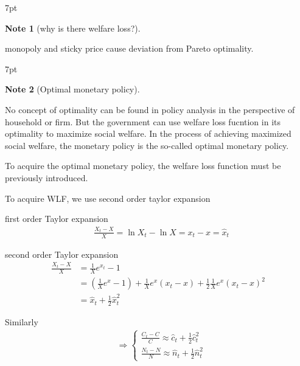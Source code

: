 \documentclass{article}
\newenvironment{blueblock}{
\def\FrameCommand{
  \hspace{1pt}
    {\color{DarkBlue}
    \vrule width 2pt}
    {\color{blueshade}
    \vrule width 4pt}
  \colorbox{blueshade}
}
\MakeFramed{
  \advance
  \hsize-
  \width
  \FrameRestore}
\noindent\hspace{-4.55pt}%
\begin{adjustwidth}{}{7pt}
\vspace{2pt}\vspace{2pt}
}
{\vspace{2pt}\end{adjustwidth}\endMakeFramed}
\newtheorem{note}{Note}
\begin{document}
\begin{blueblock}
\begin{note}[why is there welfare loss?]
\end{note}
monopoly and sticky price cause deviation from Pareto optimality.
\end{blueblock}



\begin{blueblock}
\begin{note}[Optimal monetary policy]
\end{note}
No concept of optimality can be found in policy analysis in the perspective of household or firm. But the government can use welfare loss fucntion in its optimality to maximize social welfare. In the process of achieving maximized social welfare, the monetary policy is the so-called optimal monetary policy.

\end{blueblock}

To acquire the optimal monetary policy, the welfare loss function must be previously introduced.


To acquire WLF, we use second order taylor expansion

first order Taylor expansion
\begin{align}
& \frac{X_t -X}{X}=\ln X_t -\ln X=x_t -x =\hat x_t 
\end{align}

second order Taylor expansion
\begin{equation}
\begin{split}
 \frac{X_t -X}{X}&=\frac{1}{X}e^{x_t}-1
\\& = (\frac{1}{X}e^x -1)+\frac{1}{X}e^x(x_t -x)+\frac{1}{2}\frac{1}{X}e^x (x_t-x)^2
\\& = \hat x_t +\frac{1}{2}\hat x_t^2
\end{split}
\end{equation}

Similarly
\begin{align}
& \Rightarrow 
\begin{cases}
\frac{C_t -C}{C}\approx \hat c_t +\frac{1}{2} \hat c_t^2 
\\\frac{N_t -N}{N}\approx \hat n_t +\frac{1}{2} \hat n_t^2 
\end{cases}
\end{align}
\end{document}
